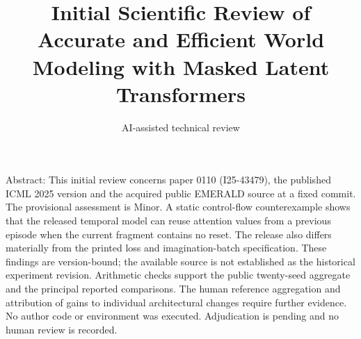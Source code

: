 \documentclass[10pt]{article}
\title{Initial Scientific Review of
Accurate and Efficient World Modeling with Masked Latent Transformers}
\author{AI-assisted technical review}
\date{}
\begin{document}
\maketitle
Abstract: This initial review concerns paper 0110 (I25-43479), the published ICML 2025 version and the acquired public EMERALD source at a fixed commit. The provisional assessment is Minor. A static control-flow counterexample shows that the released temporal model can reuse attention values from a previous episode when the current fragment contains no reset. The release also differs materially from the printed loss and imagination-batch specification. These findings are version-bound; the available source is not established as the historical experiment revision. Arithmetic checks support the public twenty-seed aggregate and the principal reported comparisons. The human reference aggregation and attribution of gains to individual architectural changes require further evidence. No author code or environment was executed. Adjudication is pending and no human review is recorded.\par
\end{document}
